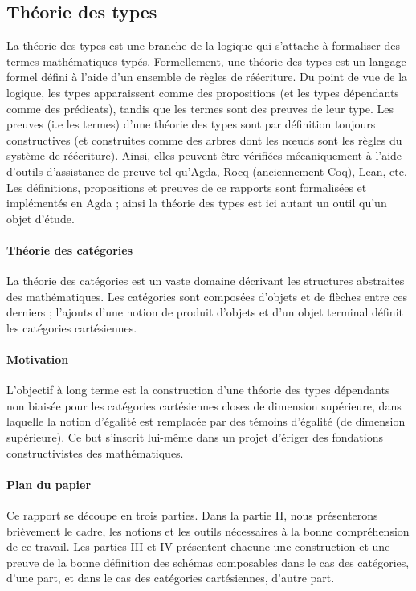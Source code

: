 \documentclass[12pt']{article}
\begin{document}
\subsection{Théorie des types} La théorie des types est une branche de la logique qui s'attache à formaliser des termes mathématiques typés. Formellement, une théorie des types est un langage formel défini à l'aide d'un ensemble de règles de réécriture. Du point de vue de la logique, les types apparaissent comme des propositions (et les types dépendants comme des prédicats), tandis que les termes sont des preuves de leur type. Les preuves (i.e les termes) d'une théorie des types sont par définition toujours constructives (et construites comme des arbres dont les nœuds sont les règles du système de réécriture). Ainsi, elles peuvent être vérifiées mécaniquement à l'aide d'outils d'assistance de preuve tel qu'Agda, Rocq (anciennement Coq), Lean, etc. Les définitions, propositions et preuves de ce rapports sont formalisées et implémentés en Agda ; ainsi la théorie des types est ici autant un outil qu'un objet d'étude.
  
\paragraph{Théorie des catégories} La théorie des catégories est un vaste domaine décrivant les structures abstraites des mathématiques. Les catégories sont composées d'objets et de flèches entre ces derniers ; l'ajouts d'une notion de produit d'objets et d'un objet terminal définit les catégories cartésiennes.

\paragraph{Motivation} L'objectif à long terme est la construction d'une théorie des types dépendants non biaisée pour les catégories cartésiennes closes de dimension supérieure, dans laquelle la notion d'égalité est remplacée par des témoins d'égalité (de dimension supérieure). Ce but s'inscrit lui-même dans un projet d'ériger des fondations constructivistes des mathématiques.

\paragraph{Plan du papier} Ce rapport se découpe en trois parties. Dans la partie II, nous présenterons brièvement le cadre, les notions et les outils nécessaires à la bonne compréhension de ce travail. Les parties III et IV présentent chacune une construction et une preuve de la bonne définition des schémas composables dans le cas des catégories, d'une part, et dans le cas des catégories cartésiennes, d'autre part.
\end{document}
